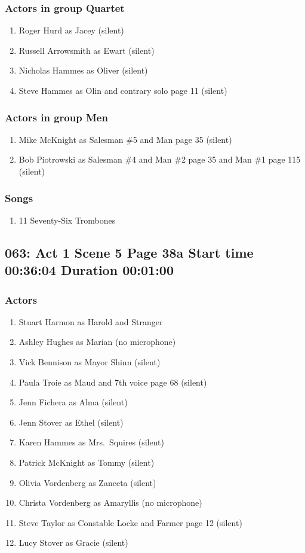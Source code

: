 \subsubsection{Actors in group Quartet}
\begin{enumerate}
\item Roger Hurd as Jacey (silent)
\item Russell Arrowsmith as Ewart (silent)
\item Nicholas Hammes as Oliver (silent)
\item Steve Hammes as Olin and contrary solo page 11 (silent)
\end{enumerate}
\subsubsection{Actors in group Men}
\begin{enumerate}
\item Mike McKnight as Salesman \#5 and Man page 35 (silent)
\item Bob Piotrowski as Salesman \#4 and Man \#2 page 35 and Man \#1 page 115 (silent)
\end{enumerate}

\subsubsection{Songs}
\begin{enumerate}
\item 11 Seventy-Six Trombones
\end{enumerate}
\subsection{063: Act 1 Scene 5 Page 38a Start time 00:36:04 Duration 00:01:00}

\subsubsection{Actors}
\begin{enumerate}
\item Stuart Harmon as Harold and Stranger
\item Ashley Hughes as Marian (no microphone)
\item Vick Bennison as Mayor Shinn (silent)
\item Paula Troie as Maud and 7th voice page 68 (silent)
\item Jenn Fichera as Alma (silent)
\item Jenn Stover as Ethel (silent)
\item Karen Hammes as Mrs.~Squires (silent)
\item Patrick McKnight as Tommy (silent)
\item Olivia Vordenberg as Zaneeta (silent)
\item Christa Vordenberg as Amaryllis (no microphone)
\item Steve Taylor as Constable Locke and Farmer page 12 (silent)
\item Lucy Stover as Gracie (silent)
\end{enumerate}
